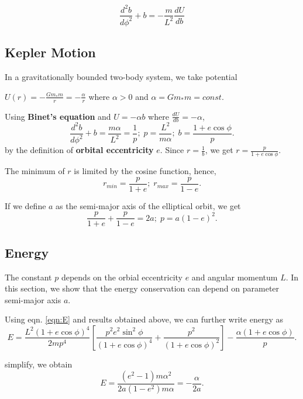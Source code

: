 \documentclass{article}
\begin{document}
 \begin{equation}
    \frac{d^2 b}{d\phi^2} + b = - \frac{m}{L^2}\frac{dU}{db}
\end{equation}

\subsection{Kepler Motion}

In a gravitationally bounded two-body system, we take potential 

$U(r) = -\frac{Gm_\ast m}{r} = - \frac{\alpha}{r}$ where $\alpha > 0$ and $\alpha = Gm_\ast m = const$.

Using \textbf{Binet's equation} and $U = -\alpha b$ where $\frac{dU}{db} = -\alpha$,
\begin{equation}
    \frac{d^2 b}{d\phi^2} +b = \frac{m\alpha}{L^2} = \frac{1}{p}; \; p = \frac{L^2}{m\alpha}; \; b = \frac{1+e \cos{\phi}}{p}.
\end{equation}
by the definition of \textbf{orbital eccentricity} $e$.
Since $r = \frac{1}{b}$, we get $r = \frac{p}{1 + e\cos{\phi}}$.

The minimum of $r$ is limited by the cosine function, hence,
\begin{equation}
    r_{\textit{min}} = \frac{p}{1+e}; \; r_{\textit{max}} = \frac{p}{1-e}.
\end{equation}

If we define $a$ as the semi-major axis of the elliptical orbit, we get
\begin{equation}
    \frac{p}{1+e} + \frac{p}{1-e} = 2a; \; p = a(1-e)^2.
\end{equation}

\subsection{Energy}
The constant $p$ depends on the orbial eccentricity $e$ and angular momentum $L$. In this section, we show that the energy conservation
can depend on parameter semi-major axis $a$.

Using eqn. \ref{eqn:E} and results obtained above, we can further write energy as 
\begin{equation}
    E = \frac{L^2 (1+e \cos{\phi})^4}{2mp^4} \left[\frac{p^2 e^2 \sin^2{\phi}}{(1+e\cos{\phi})^4}
    + \frac{p^2}{(1+e\cos{\phi})^2}\right] - \frac{\alpha (1+e\cos{\phi})}{p}.
\end{equation}

simplify, we obtain 
\begin{equation}
    E = \frac{(e^2 -1)m\alpha^2}{2a (1-e^2)m\alpha} = -\frac{\alpha}{2a}.
\end{equation}
\end{document}
